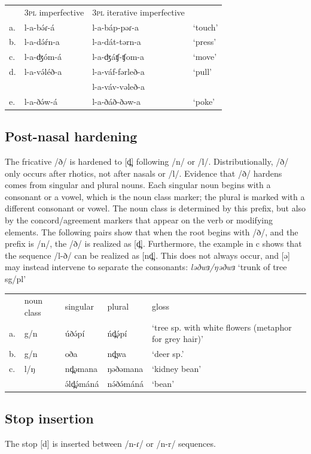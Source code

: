 \ea
\begin{tabular}[t]{llll}
&	3\textsc{pl} imperfective	&	3\textsc{pl} iterative imperfective\\
a.	&	l-a-bə́ɾ-á	&	l-a-báp-pəɾ-a	&	‘touch’\\
b.	&	l-a-də́ŕn-a	&	l-a-dát-tərn-a	&	‘press’\\
c.	&	l-a-ʤóm-á	&	l-a-ʤáʧ-ʧom-a	&	‘move’\\
d.	&	l-a-və́léð-a	&	l-a-váf-fərleð-a	&	‘pull’\\
&&	l-a-váv-vəleð-a\\
e.	&	l-a-ðə́w-á	&	l-a-ðáð-ðəw-a		&	‘poke’\\
\end{tabular}
\z

\subsection{Post-nasal hardening}
The fricative /ð/ is hardened to [d̪] following /n/ or /l/. Distributionally, /ð/ only occurs after rhotics, not after nasals or /l/. Evidence that /ð/ hardens comes from singular and plural nouns. Each singular noun begins with a consonant or a vowel, which is the noun class marker; the plural is marked with a different consonant or vowel. The noun class is determined by this prefix, but also by the concord/agreement markers that appear on the verb or modifying elements. The following pairs show that when the root begins with /ð/, and the prefix is /n/, the /ð/ is realized as [d̪]. Furthermore, the example in c shows that the sequence /l-ð/ can be realized as [nd̪]. This does not always occur, and [ə] may instead intervene to separate the consonants: \textit{ləðwɜ/ŋəðwɜ} ‘trunk of tree sg/pl’

\ea
\begin{tabular}[t]{llllp{4cm}}
&	noun class	&	singular		&	plural	&	gloss\\
a.	&	g/n	&	úðə́pí		&	ńd̪ə́pí	&	‘tree sp. with white flowers (metaphor for grey hair)’\\
b.	&	g/n	&	oða	&	nd̪wa	&	‘deer sp.’\\
c.	&	l/ŋ	&	nd̪əmana	&	ŋəðəmana	&	‘kidney bean’\\
&&	ə́ld̪ə́máná	&	nə́ðə́máná	&	‘bean’\\
\end{tabular}
\z

\subsection{Stop insertion}
The stop [d] is inserted between /n-ɾ/ or /n-r/ sequences. 

